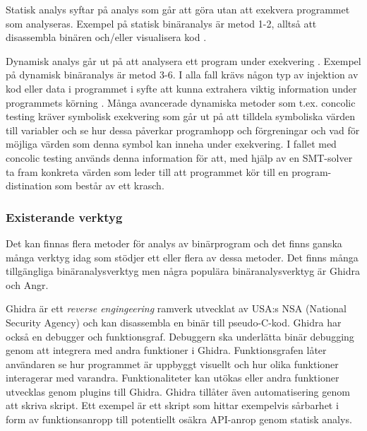 Statisk analys syftar på analys som går att göra utan att exekvera programmet
som analyseras. Exempel på statisk binäranalys är metod 1-2, alltså att
disassembla binären och/eller visualisera kod \cite{dynamic_bin_analysis}.

Dynamisk analys går ut på att analysera ett program under exekvering
\cite{dynamic_bin_analysis}. Exempel på dynamisk binäranalys är metod 3-6. I
alla fall krävs någon typ av injektion av kod eller data i programmet i syfte
att kunna extrahera viktig information under programmets körning
\cite{dynamic_bin_analysis}. Många avancerade dynamiska metoder som t.ex.
concolic testing kräver symbolisk exekvering som går ut på att tilldela
symboliska värden till variabler och se hur dessa påverkar programhopp och
förgreningar och vad för möjliga värden som denna symbol kan inneha under
exekvering. I fallet med concolic testing används denna information för att,
med hjälp av en SMT-solver ta fram konkreta värden som leder till att
programmet kör till en program-distination som består av ett krasch.

\subsubsection{Existerande verktyg}
Det kan finnas flera metoder för analys av binärprogram och det finns ganska
många verktyg idag som stödjer ett eller flera av dessa metoder. Det finns
många tillgängliga binäranalysverktyg men några populära binäranalysverktyg är
Ghidra\cite{ghidra_website} och Angr\cite{angr_web}.



Ghidra är ett \emph{reverse engingeering} ramverk utvecklat av USA:s NSA
(National Security Agency) och kan disassembla en binär till pseudo-C-kod.
Ghidra har också en debugger och funktionsgraf. Debuggern ska underlätta binär
debugging genom att integrera med andra funktioner i Ghidra. Funktionsgrafen
låter användaren se hur programmet är uppbyggt visuellt och hur olika
funktioner interagerar med varandra. Funktionaliteter kan utökas eller andra
funktioner utvecklas genom plugins till Ghidra\cite{ghidra_use_cases}. Ghidra
tillåter även automatisering genom att skriva skript. Ett exempel är ett skript
som hittar exempelvis sårbarhet i form av funktionsanropp till potentiellt
osäkra API-anrop genom statisk analys\cite{ghidra_script}.

